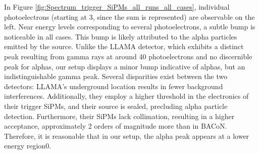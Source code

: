 \documentclass[11pt,a4paper,english,oneside, pdf]{article}
\begin{document}
	In Figure \ref{fig:Spectrum_trigger_SiPMs_all_runs_all_cases}, individual photoelectrons (starting at 3, since the sum is represented) are observable on the left. Near energy levels corresponding to several photoelectrons, a subtle bump is noticeable in all cases. This bump is likely attributed to the alpha particles emitted by the source. Unlike the LLAMA detector, which exhibits a distinct peak resulting from gamma rays at around 40 photoelectrons and no discernible peak for alphas, our setup displays a minor bump indicative of alphas, but an indistinguishable gamma peak. Several disparities exist between the two detectors: LLAMA's underground location results in fewer background interferences. Additionally, they employ a higher threshold in the electronics of their trigger SiPMs, and their source is sealed, precluding alpha particle detection. Furthermore, their SiPMs lack collimation, resulting in a higher acceptance, approximately 2 orders of magnitude more than in BACoN. Therefore, it is reasonable that in our setup, the alpha peak appears at a lower energy region0.
\end{document}
